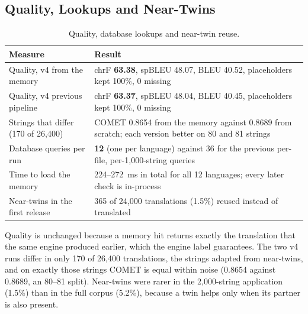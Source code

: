 \subsection{Quality, Lookups and Near-Twins}
\begin{table}[H]
\centering
\caption[Quality, lookups and near-twins]{Quality, database lookups and near-twin reuse.}
\label{tab:tmquality}
\begin{tabularx}{\linewidth}{@{}l L@{}}
\toprule
\textbf{Measure} & \textbf{Result} \\
\midrule
Quality, v4 from the memory & chrF \textbf{63.38}, spBLEU 48.07, BLEU 40.52, placeholders kept 100\%, 0 missing \\
Quality, v4 previous pipeline & chrF \textbf{63.37}, spBLEU 48.04, BLEU 40.45, placeholders kept 100\%, 0 missing \\
Strings that differ (170 of 26,400) & COMET 0.8654 from the memory against 0.8689 from scratch; each version better on 80 and 81 strings \\
Database queries per run & \textbf{12} (one per language) against 36 for the previous per-file, per-1,000-string queries \\
Time to load the memory & 224--272~ms in total for all 12 languages; every later check is in-process \\
Near-twins in the first release & 365 of 24,000 translations (1.5\%) reused instead of translated \\
\bottomrule
\end{tabularx}
\end{table}

Quality is unchanged because a memory hit returns exactly the translation that the same engine produced earlier, which the
engine label guarantees. The two v4 runs differ in only 170 of 26,400 translations, the strings adapted from near-twins,
and on exactly those strings COMET is equal within noise (0.8654 against 0.8689, an 80--81 split). Near-twins were rarer in the 2,000-string application (1.5\%) than in the full corpus (5.2\%),
because a twin helps only when its partner is also present.


